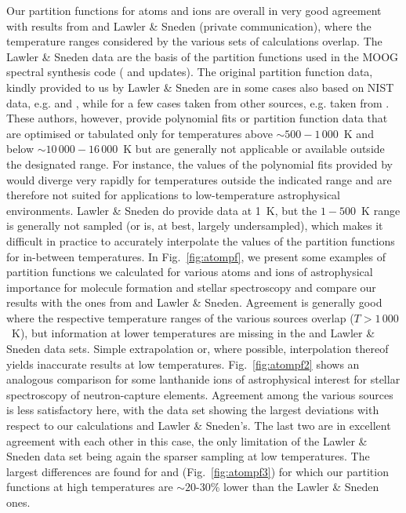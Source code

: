 \documentclass[traditabstract]{aa} %
\newcommand{\lawler}{Lawler \& Sneden}
\begin{document}
Our partition functions for atoms and ions are overall in very good agreement with results from \cite{1987A&A...182..348I} and {\lawler} (private communication), where the temperature ranges considered by the various sets of calculations overlap.  The {\lawler} data  are the basis of the partition functions used in the {\sc MOOG} spectral synthesis code (\citealt{Sneden:1973} and updates).  The original partition function data, kindly provided to us by {\lawler} are in some cases also based on NIST data, e.g.  \citep{lawler_atomic_2001} and  \citep{lawler_improved_2009}, while for a few cases taken from other sources, e.g.  taken from \cite{bord_abundance_2002} \citep[see][]{lawler_improved_2004}.  These authors, however, provide polynomial fits or partition function data that are optimised or tabulated only for temperatures above ${\sim}{500}-{1\,000}$~K and below ${\sim}{10\,000}-{16\,000}$~K but are generally not applicable or available outside the designated range. For instance, the values of the polynomial fits provided by \cite{1987A&A...182..348I} would diverge very rapidly for temperatures outside the indicated range and are therefore not suited for applications to low-temperature astrophysical environments. {\lawler} do provide data at 1~K, but the ${1}-{500}$~K range is generally not sampled (or is, at best, largely undersampled), which makes it difficult in practice to accurately interpolate the values of the partition functions for in-between temperatures.
In Fig.~\ref{fig:atompf}, we present some examples of partition functions we calculated for various atoms and ions of astrophysical importance for molecule formation and stellar spectroscopy and compare our results with the ones from \cite{1987A&A...182..348I} and {\lawler}.  Agreement is generally good where the respective temperature ranges of the various sources overlap ($T>{1\,000}$~K), but information at lower temperatures are missing in the \cite{1987A&A...182..348I} and {\lawler} data sets. Simple extrapolation or, where possible, interpolation thereof yields inaccurate results at low temperatures.
Fig.~\ref{fig:atompf2} shows an analogous comparison for some lanthanide ions of astrophysical interest for stellar spectroscopy of neutron-capture elements. Agreement among the various sources is less satisfactory here, with the \cite{1987A&A...182..348I} data set showing the largest deviations with respect to our calculations and {\lawler}'s. The last two are in excellent agreement with each other in this case, the only limitation of the {\lawler} data set being again the sparser sampling at low temperatures.  The largest differences are found for  and  (Fig.~\ref{fig:atompf3}) for which our partition functions at high temperatures are ${\sim}20$-$30$\% lower than the {\lawler} ones.
\end{document}
